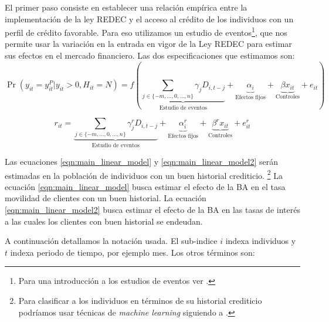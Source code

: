 \documentclass[11pt]{article}
\theoremstyle{plain}
\theoremstyle{plain}
\begin{document}
El primer paso consiste en establecer una relación empírica entre la implementación de la ley REDEC y el acceso al crédito de los individuos con un perfil de crédito favorable. Para eso utilizamos un estudio de eventos\footnote{Para una introducción a los estudios de eventos ver \textcite{miller_introductory_2023}.},  que nos permite usar la variación en la entrada en vigor de la Ley REDEC para estimar sus efectos en el mercado financiero. Las dos especificaciones que estimamos son:
\begin{equation}
    \Pr(y_{it}=y_{it}^P|y_{it} > 0, H_{it}= N) = f\left(
    \underbrace{\sum_{j\in \{-m,..., 0,...,n\}}\gamma_j D_{i,t-j}}_{\text{Estudio de eventos}} +
    \underbrace{\alpha_i
    }_{\text{Efectos fijos}} +
    \underbrace{\beta x_{it}}_{\text{Controles}} + e_{it}\right)
    \label{eqn:main_linear_model}
\end{equation}

\begin{equation}
    r_{it} =
    \underbrace{\sum_{j\in \{-m,..., 0,...,n\}}\gamma_j^r D_{i,t-j}}_{\text{Estudio de eventos}} +
    \underbrace{\alpha_i^r
    }_{\text{Efectos fijos}} +
    \underbrace{\beta^r x_{it}}_{\text{Controles}} + e_{it}^r
    \label{eqn:main_linear_model2}
\end{equation}

Las ecuaciones \ref{eqn:main_linear_model} y \ref{eqn:main_linear_model2} serán estimadas en la población de individuos con un buen historial crediticio. \footnote{Para clasificar a los individuos en términos de su historial crediticio podríamos usar técnicas de \textit{machine learning} siguiendo a \textcite{liberman_equilibrium_2018}. }
La ecuación \ref{eqn:main_linear_model} busca estimar el efecto de la BA en el tasa movilidad de clientes con un buen historial. La ecuación \ref{eqn:main_linear_model2} busca estimar el efecto de la BA en las tasas de interés a las cuales los clientes con buen historial se endeudan.

A continuación detallamos la notación usada. El sub-indice $i$ indexa individuos y $t$ indexa periodo de tiempo, por ejemplo mes. Los otros términos son:
\end{document}
